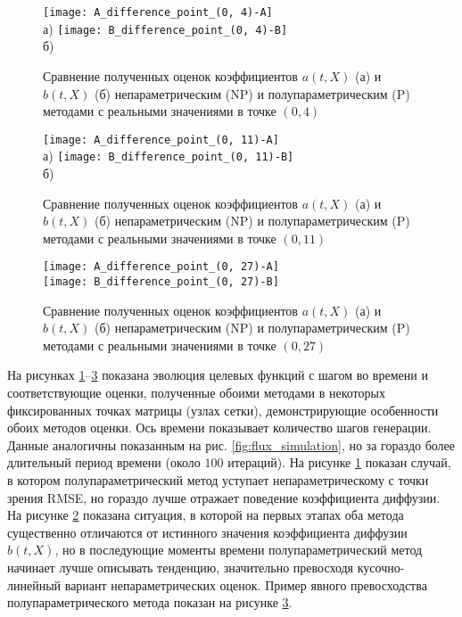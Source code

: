 \begin{figure}[!h]
	\centering
	\texttt{[image: A\_difference\_point\_(0, 4)-A]}\\
	а)
	\texttt{[image: B\_difference\_point\_(0, 4)-B]}\\
	б)
	\caption{Сравнение полученных оценок коэффициентов $a(t,X)$ (а) и $b(t,X)$ (б) непараметрическим (NP) и полупараметрическим (P) методами с реальными значениями в точке $(0,4)$}
	\label{fig:difference_0_4}
\end{figure}

\begin{figure}[!h]
	\centering
	\texttt{[image: A\_difference\_point\_(0, 11)-A]}\\
	а)
	\texttt{[image: B\_difference\_point\_(0, 11)-B]}\\
	б)
	\caption{Сравнение полученных оценок коэффициентов $a(t,X)$ (а) и $b(t,X)$ (б) непараметрическим (NP) и полупараметрическим (P) методами с реальными значениями в точке $(0,11)$}
	\label{fig:difference_0_11}
\end{figure}

\begin{figure}[!h]
	\centering
	\texttt{[image: A\_difference\_point\_(0, 27)-A]}\\
	\texttt{[image: B\_difference\_point\_(0, 27)-B]}\\
	\caption{Сравнение полученных оценок коэффициентов $a(t,X)$ (а) и $b(t,X)$ (б) непараметрическим (NP) и полупараметрическим (P) методами с реальными значениями в точке $(0,27)$}
	\label{fig:difference_0_27}
\end{figure}

На рисунках \ref{fig:difference_0_4}--\ref{fig:difference_0_27} показана эволюция целевых функций с шагом во времени и соответствующие оценки, полученные обоими методами в некоторых фиксированных точках матрицы (узлах сетки), демонстрирующие особенности обоих методов оценки. Ось времени показывает количество шагов генерации. Данные аналогичны показанным на рис. \ref{fig:flux_simulation}, но за гораздо более длительный период времени (около $100$ итераций).
На рисунке \ref{fig:difference_0_4} показан случай, в котором полупараметрический метод уступает непараметрическому с точки зрения RMSE, но гораздо лучше отражает поведение коэффициента диффузии. На рисунке \ref{fig:difference_0_11} показана ситуация, в которой на первых этапах оба метода существенно отличаются от истинного значения коэффициента диффузии $b(t,X)$, но в последующие моменты времени полупараметрический метод начинает лучше описывать тенденцию, значительно превосходя кусочно-линейный вариант непараметрических оценок. Пример явного превосходства полупараметрического метода показан на рисунке \ref{fig:difference_0_27}.

